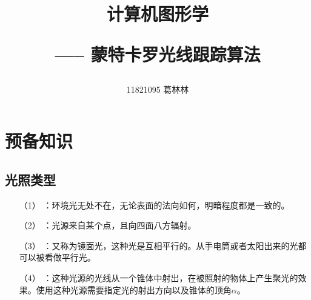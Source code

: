 \documentclass[10pt]{article}
\title{计算机图形学 \hspace{2pt}\hspace{2pt} \begin{large}----- \hspace{2pt} 蒙特卡罗光线跟踪算法 \end{large} }
\author{11821095 葛林林}
\begin{document}
\maketitle
\section{预备知识}
\subsection{光照类型}
\begin{itemize}
\item[（1）]{}：环境光无处不在，无论表面的法向如何，明暗程度都是一致的。
\item[（2）]{}：光源来自某个点，且向四面八方辐射。
\item[（3）]{}：又称为镜面光，这种光是互相平行的。从手电筒或者太阳出来的光都可以被看做平行光。
\item[（4）]{}：这种光源的光线从一个锥体中射出，在被照射的物体上产生聚光的效果。使用这种光源需要指定光的射出方向以及锥体的顶角$\alpha$。
\end{itemize}
\end{document}
